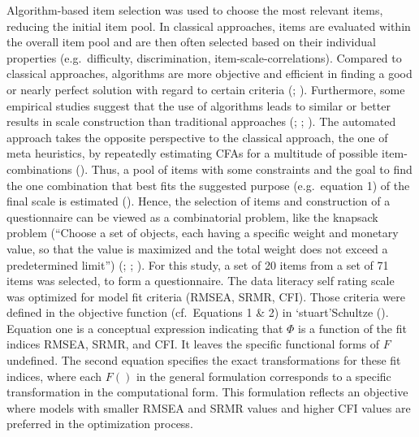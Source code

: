 \documentclass[
  12pt,
  a4paper,
  twoside]{article}
\begin{document}
Algorithm-based item selection was used to choose the most relevant items, reducing the initial item pool. In classical approaches, items are evaluated within the overall item pool and are then often selected based on their individual properties (e.g.~difficulty, discrimination, item-scale-correlations).
Compared to classical approaches, algorithms are more objective and efficient in finding a good or nearly perfect solution with regard to certain criteria (; ). Furthermore, some empirical studies suggest that the use of algorithms leads to similar or better results in scale construction than traditional approaches (; ; ). The automated approach takes the opposite perspective to the classical approach, the one of meta heuristics, by repeatedly estimating CFAs for a multitude of possible item-combinations (). Thus, a pool of items with some constraints and the goal to find the one combination that best fits the suggested purpose (e.g.~equation 1) of the final scale is estimated (). Hence, the selection of items and construction of a questionnaire can be viewed as a combinatorial problem, like the knapsack problem (``Choose a set of objects, each having a specific weight and monetary value, so that the value is maximized and the total weight does not exceed a predetermined limit'') (; ; ).
For this study, a set of 20 items from a set of 71 items was selected, to form a questionnaire. The data literacy self rating scale was optimized for model fit criteria (RMSEA, SRMR, CFI). Those criteria were defined in the objective function (cf.~Equations 1 \& 2) in `stuart'Schultze (). Equation one is a conceptual expression indicating that \(\Phi\) is a function of the fit indices RMSEA, SRMR, and CFI. It leaves the specific functional forms of \(F\) undefined. The second equation specifies the exact transformations for these fit indices, where each \(F()\) in the general formulation corresponds to a specific transformation in the computational form. This formulation reflects an objective where models with smaller RMSEA and SRMR values and higher CFI values are preferred in the optimization process.
\end{document}
